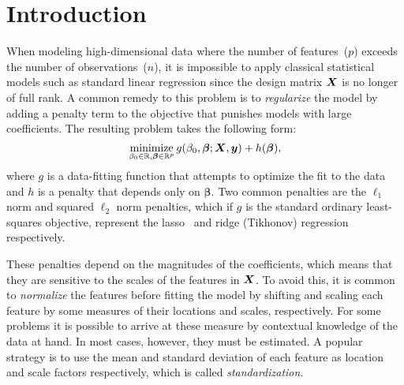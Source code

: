 \section{Introduction}

When modeling high-dimensional data where the number of features~(\(p\)) exceeds the number
of observations~(\(n\)), it is impossible to apply classical statistical models such as
standard linear regression since the design matrix \(\boldsymbol X\) is no longer of full rank. A
common remedy to this problem is to \emph{regularize} the model by adding a penalty term to
the objective that punishes models with large coefficients. The resulting problem takes the
following form:
\begin{equation}
  \label{eq:general-objective}
  \operatorname*{minimize}_{\beta_0 \in \mathbb{R},\boldsymbol{\beta} \in \mathbb{R}^p} g(\beta_0, \boldsymbol\beta; \boldsymbol X, \boldsymbol y) + h(\boldsymbol\beta),
\end{equation}
%
where \(g\) is a data-fitting function that attempts to optimize the fit to the data and
\(h\) is a penalty that depends only on \(\bm{\beta}\). Two common penalties are the
\(\ell_1\) norm and squared \(\ell_2\) norm penalties, which if \(g\) is the standard
ordinary least-squares objective, represent the
lasso~\citep{tibshirani1996,santosa1986,donoho1994} and ridge (Tikhonov) regression
respectively.

These penalties depend on the magnitudes of the coefficients, which means that they are
sensitive to the scales of the features in \(\boldsymbol X\). To avoid this, it is common to
\emph{normalize} the features before fitting the model by shifting and scaling each feature
by some measures of their locations and scales, respectively. For some problems it is
possible to arrive at these measure by contextual knowledge of the data at hand. In most
cases, however, they must be estimated. A popular strategy is to use the mean and standard
deviation of each feature as location and scale factors respectively, which is called
\emph{standardization}.

